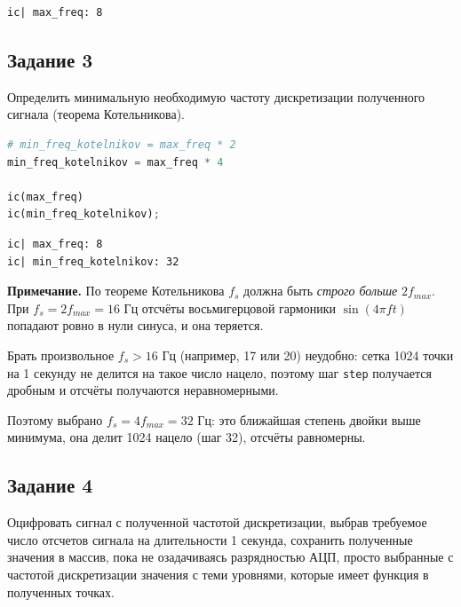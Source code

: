 \documentclass[a4paper,14pt,oneside,openany]{memoir}
\begin{document}
\begin{lstlisting}[language={}, numbers=none, backgroundcolor=\color{white}, caption={Результат выполнения: максимальная частота сигнала}]
ic| max_freq: 8
\end{lstlisting}

\subsection{Задание 3}

Определить минимальную необходимую частоту дискретизации полученного сигнала (теорема Котельникова).

\begin{lstlisting}[language=Python, caption={Частота дискретизации по Котельникову}]
# min_freq_kotelnikov = max_freq * 2
min_freq_kotelnikov = max_freq * 4

ic(max_freq)
ic(min_freq_kotelnikov);
\end{lstlisting}

\begin{lstlisting}[language={}, numbers=none, backgroundcolor=\color{white}, caption={Результат выполнения: частота дискретизации по Котельникову}]
ic| max_freq: 8
ic| min_freq_kotelnikov: 32
\end{lstlisting}

\textbf{Примечание.} По теореме Котельникова $f_s$ должна быть \textit{строго больше} $2 f_{max}$. При $f_s = 2 f_{max} = 16$ Гц отсчёты восьмигерцовой гармоники $\sin(4\pi f t)$ попадают ровно в нули синуса, и она теряется.

Брать произвольное $f_s > 16$ Гц (например, 17 или 20) неудобно: сетка 1024 точки на 1 секунду не делится на такое число нацело, поэтому шаг \texttt{step} получается дробным и отсчёты получаются неравномерными.

Поэтому выбрано $f_s = 4 f_{max} = 32$ Гц: это ближайшая степень двойки выше минимума, она делит 1024 нацело (шаг 32), отсчёты равномерны.

\subsection{Задание 4}

Оцифровать сигнал с полученной частотой дискретизации, выбрав требуемое число отсчетов сигнала на длительности 1 секунда, сохранить полученные значения в массив, пока не озадачиваясь разрядностью АЦП, просто выбранные с частотой дискретизации значения с теми уровнями, которые имеет функция в полученных точках.
\end{document}

